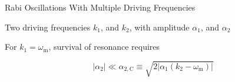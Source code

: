 \begin{frame}{Rabi Oscillations With Multiple Driving Frequencies}


%
%
%
%
%
%

\begin{tcolorbox}
Two driving frequencies $k_1$, and $k_2$, with amplitude $\alpha_1$, and $\alpha_2$

For $k_1 = \omega_{\mathrm m}$, survival of resonance requires

\begin{equation*}
    \lvert \alpha_2\rvert \ll  \alpha_{2,\mathrm C}\equiv\sqrt{ 2 \lvert \alpha_1 (k_2 - \omega_{\mathrm m}) \rvert }
\end{equation*}

\end{tcolorbox}






\end{frame}









